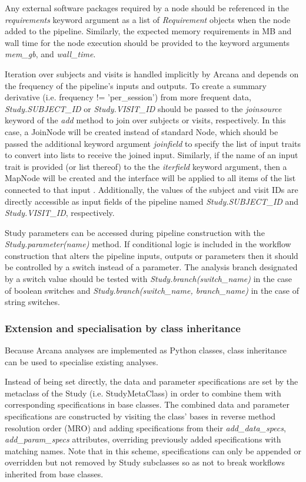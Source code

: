 \documentclass[smallextended]{svjour3}       %
\begin{document}
Any external software packages required by a node should be referenced
in the \emph{requirements} keyword argument as a list of
\emph{Requirement} objects when the node added to the pipeline.
Similarly, the expected memory requirements in MB and
wall time for the node execution should be provided to the keyword arguments
\emph{mem\_gb}, and \emph{wall\_time}.

Iteration over subjects and visits is handled implicitly by Arcana and
depends on the frequency of the pipeline's inputs and outputs. To create
a summary derivative (i.e. frequency != 'per\_session') from more frequent
data, \emph{Study.SUBJECT\_ID} or \emph{Study.VISIT\_ID} should be
passed to the \emph{joinsource} keyword of the \emph{add} method to join over subjects or visits, respectively.
In this case, a JoinNode will be created instead of standard Node,
which should be passed the additional keyword argument \emph{joinfield} to
specify the list of input traits to convert into lists to receive the joined input.
Similarly, if the name of an input trait is provided (or list thereof) to the the \emph{iterfield}
keyword argument, then a MapNode will be created and the interface will
be applied to all items of the list connected to that input \citep{gorgolewski_nipype:_2011}.
Additionally, the values of the subject and visit IDs are directly accessible as input fields of the pipeline
named \emph{Study.SUBJECT\_ID} and \emph{Study.VISIT\_ID}, respectively.

Study parameters can be accessed during pipeline construction with the
\emph{Study.parameter(name)} method. If conditional logic is included in
the workflow construction that alters the pipeline inputs, outputs or
parameters then it should be controlled by a switch instead of a
parameter. The analysis branch designated by a switch value should be
tested with \emph{Study.branch(switch\_name)} in the case of boolean switches and
\emph{Study.branch(switch\_name, branch\_name)} in the case of string switches.

\subsubsection*{Extension and specialisation by class inheritance}
\label{extension-and-specialisation-by-class-inheritance}

Because Arcana analyses are implemented as Python classes, class
inheritance can be used to specialise existing analyses.

Instead of being set directly, the data and parameter specifications are set
by the metaclass of the Study (i.e. StudyMetaClass)
in order to combine them with corresponding specifications in base classes.
The combined data and parameter specifications are constructed by visiting the class'
bases in reverse method resolution order (MRO) and adding specifications
from their \emph{add\_data\_specs}, \emph{add\_param\_specs} attributes,
overriding previously added specifications with matching names. Note
that in this scheme, specifications can only be appended or overridden
but not removed by Study subclasses so as not to break workflows
inherited from base classes.
\end{document}
